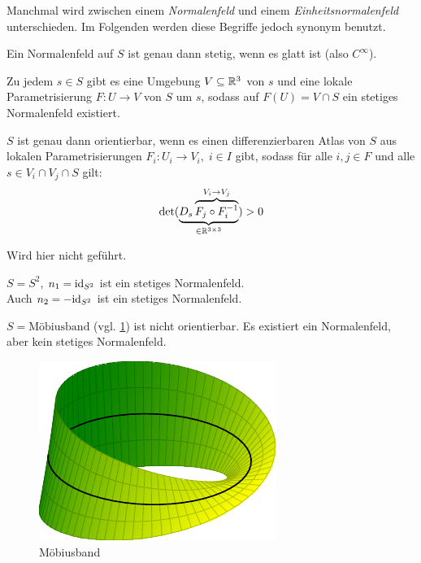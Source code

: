 Manchmal wird zwischen einem \textit{Normalenfeld} und einem
\textit{Einheitsnormalenfeld} unterschieden.
Im Folgenden werden diese Begriffe jedoch synonym benutzt.

\begin{bemerkung}%
    \begin{bemenum}
        \item Ein Normalenfeld auf $S$ ist genau dann stetig, wenn es
              glatt ist (also $C^\infty$).
        \item Zu jedem $s \in S$ gibt es eine Umgebung $V \subseteq \mathbb{R}^3$
              von $s$ und eine lokale Parametrisierung $F: U \rightarrow V$
              von $S$ um $s$, sodass auf $F(U) = V \cap S$
              ein stetiges Normalenfeld existiert.
        \item $S$ ist genau dann orientierbar, wenn es einen
              differenzierbaren Atlas von $S$ aus lokalen Parametrisierungen
              $F_i: U_i \rightarrow V_i,\;i \in I$ gibt, sodass
              für alle $i, j \in F$ und alle $s \in V_i \cap V_j \cap S$
              gilt:
              \[\det(\underbrace{D_s \overbrace{F_j \circ F_i^{-1}}^{V_i \rightarrow V_j}}_{\in \mathbb{R}^{3 \times 3}}) > 0\]
    \end{bemenum}
\end{bemerkung}

\begin{beweis}
    Wird hier nicht geführt.%
\end{beweis}

\begin{beispiel}[Normalenfelder]
    \begin{bspenum}
        \item $S = S^2$, $n_1 = \textnormal{id}_{S^2}$ ist ein stetiges Normalenfeld.\\
              Auch $n_2 = - \textnormal{id}_{S^2}$ ist ein stetiges Normalenfeld.
        \item $S = \text{Möbiusband}$ (vgl. \cref{fig:moebius-strip})
              ist nicht orientierbar. Es existiert ein Normalenfeld,
              aber kein stetiges Normalenfeld.
    \end{bspenum}
\end{beispiel}

\begin{figure}[htp]
    \centering
    \includegraphics[width=0.5\linewidth, keepaspectratio]{figures/moebius-strip.pdf}
    \caption{Möbiusband}
    \label{fig:moebius-strip}
\end{figure}
